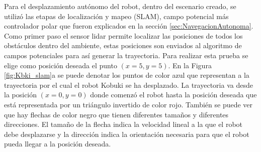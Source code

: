 Para el desplazamiento autónomo del robot, dentro del escenario creado, se utilizó las 
etapas de localización y mapeo (SLAM), campo potencial más controlador polar que fueron 
explicados en la sección \ref{sec:NavegacionAutonoma}. Como primer paso el sensor lidar 
permite localizar las posiciones de todos los obstáculos dentro del ambiente, estas 
posiciones son enviados al algoritmo de campos potenciales para así generar la 
trayectoria. Para realizar esta prueba se elige como posición deseada el punto 
$(x = 5, y = 5)$. En la Figura \ref{fig:Kbki_slam}a se puede denotar los puntos de color 
azul que representan a la trayectoria por el cual el robot Kobuki se ha desplazado. La 
trayectoria va desde la posición $(x = 0, y = 0)$ donde comenzó el robot hasta la posición
deseada que está representada por un triángulo invertido de color rojo. También se puede 
ver que hay flechas de color negro que tienen diferentes tamaños y diferentes direcciones.
El tamaño de la flecha indica la velocidad lineal a la que el robot debe desplazarse y 
la dirección indica la orientación necesaria para que el robot pueda llegar a la 
posición deseada.



